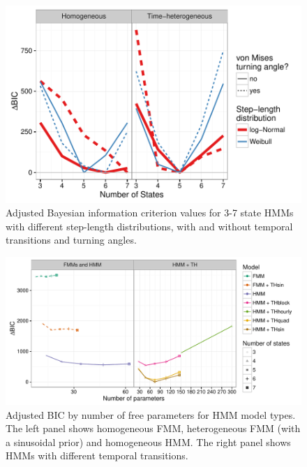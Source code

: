 \documentclass{bmcart}
\begin{document}
\begin{backmatter}
  \begin{figure}[h!]
   \includegraphics[width=5in]{figure/BICred_plot-1}
  \caption{ Adjusted Bayesian information criterion values for 3-7 state HMMs with different step-length distributions, with and without temporal transitions and turning angles.}
      \end{figure}
      
  \begin{figure}[h!]
   \includegraphics[width=5in]{figure/adj_BIC_comparisons-1}
  \caption{ Adjusted BIC by number of free parameters for HMM model types. The left panel shows homogeneous FMM, heterogeneous FMM (with a sinusoidal prior) and homogeneous HMM. The right panel shows HMMs with different temporal transitions.}
      \end{figure}
      

\end{backmatter}
\end{document}
